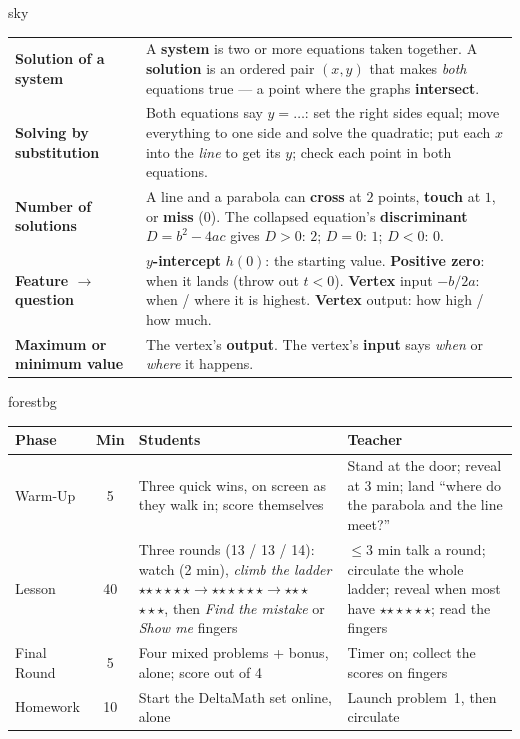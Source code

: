 \documentclass[10pt]{article}
\newcommand{\MeetingLength}{60 minutes}
\newcommand{\rung}[1]{{\color{goldacc}\ifcase#1\or$\star$\or$\star\star$\or$\star\star\star$\fi}}
\begin{document}
\begin{skillbox}{sky}
\renewcommand{\arraystretch}{1.3}
\begin{tabularx}{\linewidth}{@{}l X@{}}
\textbf{Solution of a system} & A \textbf{system} is two or more equations taken together. A
    \textbf{solution} is an ordered pair $(x,y)$ that makes \emph{both} equations true --- a point
    where the graphs \textbf{intersect}. \\
\textbf{Solving by substitution} & Both equations say $y=\ldots$: set the right sides equal; move
    everything to one side and solve the quadratic; put each $x$ into the \emph{line} to get its
    $y$; check each point in both equations. \\
\textbf{Number of solutions} & A line and a parabola can \textbf{cross} at $2$ points,
    \textbf{touch} at $1$, or \textbf{miss} ($0$). The collapsed equation's
    \textbf{discriminant} $D=b^2-4ac$ gives $D>0$: $2$; $D=0$: $1$; $D<0$: $0$. \\
\textbf{Feature $\to$ question} & \textbf{$y$-intercept} $h(0)$: the starting value.
    \textbf{Positive zero}: when it lands (throw out $t<0$). \textbf{Vertex} input $-b/2a$: when
    / where it is highest. \textbf{Vertex} output: how high / how much. \\
\textbf{Maximum or minimum value} & The vertex's \textbf{output}. The vertex's \textbf{input}
    says \emph{when} or \emph{where} it happens. \\
\end{tabularx}
\end{skillbox}

\begin{fixedskillbox}[Lesson at a Glance --- \MeetingLength]{forestbg}
\renewcommand{\arraystretch}{1.25}
\begin{tabularx}{\linewidth}{@{}l c X X@{}}
\textbf{Phase} & \textbf{Min} & \textbf{Students} & \textbf{Teacher} \\
\hline
Warm-Up & 5 & Three quick wins, on screen as they walk in; score themselves & Stand at the door; reveal at 3 min; land ``where do the parabola and the line meet?'' \\
Lesson & 40 & Three rounds (13 / 13 / 14): watch (2 min), \emph{climb the ladder} \rung1$\to$\rung2$\to$\rung3, then \emph{Find the mistake} or \emph{Show me} fingers & $\le$3 min talk a round; circulate the whole ladder; reveal when most have \rung2; read the fingers \\
Final Round & 5 & Four mixed problems + bonus, alone; score out of 4 & Timer on; collect the scores on fingers \\
Homework & 10 & Start the DeltaMath set online, alone & Launch problem~1, then circulate \\
\end{tabularx}
\end{fixedskillbox}
\end{document}
